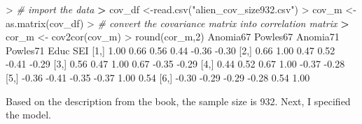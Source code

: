 \documentclass[
]{article}
\newenvironment{Shaded}{\begin{snugshade}}{\end{snugshade}}
\newcommand{\CommentTok}[1]{\textcolor[rgb]{0.56,0.35,0.01}{\textit{#1}}}
\newcommand{\DecValTok}[1]{\textcolor[rgb]{0.00,0.00,0.81}{#1}}
\newcommand{\ErrorTok}[1]{\textcolor[rgb]{0.64,0.00,0.00}{\textbf{#1}}}
\newcommand{\FloatTok}[1]{\textcolor[rgb]{0.00,0.00,0.81}{#1}}
\newcommand{\FunctionTok}[1]{\textcolor[rgb]{0.00,0.00,0.00}{#1}}
\newcommand{\NormalTok}[1]{#1}
\newcommand{\OtherTok}[1]{\textcolor[rgb]{0.56,0.35,0.01}{#1}}
\newcommand{\SpecialCharTok}[1]{\textcolor[rgb]{0.00,0.00,0.00}{#1}}
\newcommand{\StringTok}[1]{\textcolor[rgb]{0.31,0.60,0.02}{#1}}
\begin{document}
\begin{Shaded}
\begin{Highlighting}[]
\SpecialCharTok{\textgreater{}} \CommentTok{\# import the data}
\ErrorTok{\textgreater{}}\NormalTok{ cov\_df }\OtherTok{\textless{}{-}}\FunctionTok{read.csv}\NormalTok{(}\StringTok{"alien\_cov\_size932.csv"}\NormalTok{)}
\SpecialCharTok{\textgreater{}}\NormalTok{ cov\_m }\OtherTok{\textless{}{-}} \FunctionTok{as.matrix}\NormalTok{(cov\_df)}
\SpecialCharTok{\textgreater{}} \CommentTok{\# convert the covariance matrix into correlation matrix}
\ErrorTok{\textgreater{}}\NormalTok{ cor\_m }\OtherTok{\textless{}{-}} \FunctionTok{cov2cor}\NormalTok{(cov\_m)}
\SpecialCharTok{\textgreater{}} \FunctionTok{round}\NormalTok{(cor\_m,}\DecValTok{2}\NormalTok{)}
\NormalTok{     Anomia67 Powles67 Anomia71 Powles71  Educ   SEI}
\NormalTok{[}\DecValTok{1}\NormalTok{,]     }\FloatTok{1.00}     \FloatTok{0.66}     \FloatTok{0.56}     \FloatTok{0.44} \SpecialCharTok{{-}}\FloatTok{0.36} \SpecialCharTok{{-}}\FloatTok{0.30}
\NormalTok{[}\DecValTok{2}\NormalTok{,]     }\FloatTok{0.66}     \FloatTok{1.00}     \FloatTok{0.47}     \FloatTok{0.52} \SpecialCharTok{{-}}\FloatTok{0.41} \SpecialCharTok{{-}}\FloatTok{0.29}
\NormalTok{[}\DecValTok{3}\NormalTok{,]     }\FloatTok{0.56}     \FloatTok{0.47}     \FloatTok{1.00}     \FloatTok{0.67} \SpecialCharTok{{-}}\FloatTok{0.35} \SpecialCharTok{{-}}\FloatTok{0.29}
\NormalTok{[}\DecValTok{4}\NormalTok{,]     }\FloatTok{0.44}     \FloatTok{0.52}     \FloatTok{0.67}     \FloatTok{1.00} \SpecialCharTok{{-}}\FloatTok{0.37} \SpecialCharTok{{-}}\FloatTok{0.28}
\NormalTok{[}\DecValTok{5}\NormalTok{,]    }\SpecialCharTok{{-}}\FloatTok{0.36}    \SpecialCharTok{{-}}\FloatTok{0.41}    \SpecialCharTok{{-}}\FloatTok{0.35}    \SpecialCharTok{{-}}\FloatTok{0.37}  \FloatTok{1.00}  \FloatTok{0.54}
\NormalTok{[}\DecValTok{6}\NormalTok{,]    }\SpecialCharTok{{-}}\FloatTok{0.30}    \SpecialCharTok{{-}}\FloatTok{0.29}    \SpecialCharTok{{-}}\FloatTok{0.29}    \SpecialCharTok{{-}}\FloatTok{0.28}  \FloatTok{0.54}  \FloatTok{1.00}
\end{Highlighting}
\end{Shaded}

Based on the description from the book, the sample size is 932. Next, I
specified the model.
\end{document}
